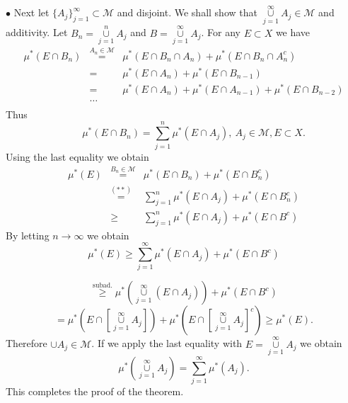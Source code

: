 \documentclass[12pt]{report}
\begin{document}
\smallskip
\noindent
$\bullet$  Next let $\{A_j\}^\infty_{j=1} \subset \mathcal{M}$ and disjoint.
We shall show that
$\overset{\infty}{\underset{j=1}{\cup}} A_j \in \mathcal{M}$ and additivity.
Let $B_n = \overset{n}{\underset{j=1}{\cup}} A_j$ and 
$B = \overset{\infty}{\underset{j=1}{\cup}}A_j$. 
 For any $E \subset X$ we
have
\begin{eqnarray*}
\mu^* (E \cap B_n) &\overset{A_n \in \mathcal{M}}{=}& \mu^* (E \cap B_n
\cap A_n) + \mu^* (E \cap B_n \cap A^c_n)\\ &=& \mu^* (E \cap A_n) +
\mu^*(E \cap B_{n-1})\\ &=& \mu^* (E \cap A_n) + \mu^*(E \cap A_{n-1}) +
\mu^* (E \cap B_{n-2})\\ &\dots&\\
\end{eqnarray*} Thus
\begin{equation*}
 \qquad \mu^* (E\cap B_n) = \sum^n_{j=1} \mu^* (E \cap A_j), \ A_j \in
\mathcal{M}, E \subset X.\tag{$\ast\ast$}
\end{equation*}
Using the last equality we obtain
\begin{eqnarray*}
\mu^* (E) &\overset{B_n \in \mathcal{M}}{=}& \mu^* (E \cap B_n) + \mu^*
(E \cap B^c_n)\\
 &\overset{(\ast\ast)}{=}& \sum^n_{j=1} \mu^* (E \cap A_j) + \mu^* (E
\cap B_n^c)\\ &\ge& \sum^n_{j=1} \mu^* (E \cap A_j) + \mu^* (E \cap B^c)
\end{eqnarray*} By letting $n \to \infty$ we obtain
\[\mu^* (E) \ge \sum^\infty_{j=1} \mu^* (E \cap A_j) + \mu^* (E
\cap  B^c)
\]



\[
\overset{ \mbox{subad.}}{\ge} \mu^* \left (
\overset{\infty}{\underset{j=1}{\cup}}  (E \cap A_j)\right ) + \mu^* (E \cap
B^c)
\]
\[ = \mu^* \left ( E \cap \left [\overset{\infty}{\underset{j=1}{\cup}} 
A_j\right ]
\right ) + \mu^*
\left ( E \cap \left [ \overset{\infty}{\underset{j=1}{\cup}}  A_j\right ]^c
\right )
\ge \mu^*(E).
\] 
Therefore $\cup A_j \in \mathcal{M}$.  If we apply the last equality with
$E = \overset{\infty}{\underset{j=1}{\cup}}A_j$ we obtain
\[
\mu^* (\overset{\infty}{\underset{j=1}{\cup}}A_j) = \sum^\infty_{j=1}
\mu^*(A_j).
\]  
This completes the proof of the theorem.
\end{document}
